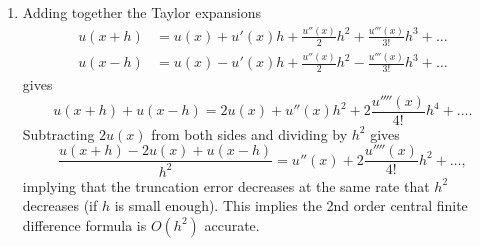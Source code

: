 \begin{solution}
\begin{enumerate}
\begin{center}
\texttt{[image: findiff]}
\end{center}

{\small \begin{verbatim}
 u = inline('exp(2*x)');
 uprime = inline('2*exp(2*x)');

 Nvec = 2.^[1:9]';
 err = zeros(size(Nvec));
 x = 1/2;
 fprintf('\n part (a)\n')
 for k=1:length(Nvec)
    N = Nvec(k);
    h = 1/(N+1);
    deriv = (u(x+h)-u(x))/h;
    err(k) = abs(uprime(x)-deriv);
    fprintf(' %3d   %10.7f\n', N, err(k));
 end
 loglog(Nvec,err,'k.-','linewidth',2,'markersize',20)

 fprintf('\n part (b)\n')
 for k=1:length(Nvec)
    N = Nvec(k);
    h = 1/(N+1);
    deriv = (u(x+h)-u(x-h))/(2*h);
    err(k) = abs(uprime(x)-deriv);
    fprintf(' %3d   %10.7f\n', N, err(k));
 end
 hold on
 loglog(Nvec,err,'r--','linewidth',2,'marker','.','markersize',20)
 set(gca,'fontsize',14)
 xlabel('N', 'fontsize',14)
 legend('part (a)','part (b)',3)
 print -depsc2 findiff.eps
\end{verbatim}}

\item Adding together the Taylor expansions 
\begin{align*}
u(x+h) &= u(x) + u'(x)h + \frac{u''(x)}{2}h^2 + \frac{u'''(x)}{3!}h^3 + \ldots\\
u(x-h) &= u(x) - u'(x)h + \frac{u''(x)}{2}h^2 - \frac{u'''(x)}{3!}h^3 + \ldots
\end{align*}
gives 
\[
u(x+h) + u(x-h) = 2u(x) + u''(x)h^2 + 2\frac{u''''(x)}{4!}h^4 + \ldots.
\]
Subtracting $2u(x)$ from both sides and dividing by $h^2$ gives
\[
\frac{u(x+h) -2u(x) + u(x-h)}{h^2} = u''(x) + 2\frac{u''''(x)}{4!}h^2 + \ldots,
\]
implying that the truncation error decreases at the same rate that $h^2$ decreases (if $h$ is small enough).  This implies the 2nd order central finite difference formula is $O(h^2)$ accurate.  

\end{enumerate}

%
%
%

\end{solution}
